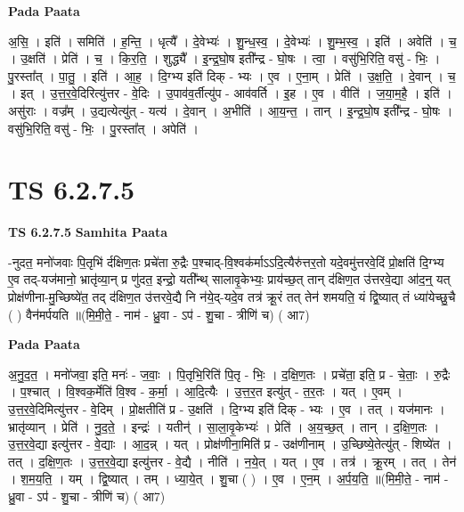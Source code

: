 \documentclass[17pt]{extarticle}
\begin{document}
\textbf{Pada Paata} \newline

अ॒सि॒ । इति॑ । समिति॑ । ह॒न्ति॒ । धृत्यै᳚ । दे॒वेभ्यः॑ । शु॒न्ध॒स्व॒ । दे॒वेभ्यः॑ । शु॒म्भ॒स्व॒ । इति॑ । अवेति॑ । च॒ । उ॒क्षति॑ । प्रेति॑ । च॒ । कि॒र॒ति॒ । शुद्ध्यै᳚ । इ॒न्द्र॒घो॒ष इती᳚न्द्र - घो॒षः । त्वा॒ । वसु॑भि॒रिति॒ वसु॑ - भिः॒ । पु॒रस्ता᳚त् । पा॒तु॒ । इति॑ । आ॒ह॒ । दि॒ग्भ्य इति॑ दिक् - भ्यः । ए॒व । ए॒ना॒म् । प्रेति॑ । उ॒क्ष॒ति॒ । दे॒वान् । च॒ । इत् । उ॒त्त॒र॒वे॒दिरित्यु॑त्तर - वे॒दिः । उ॒पाव॑व॒र्तीत्यु॑प - आव॑वर्ति । इ॒ह । ए॒व । वीति॑ । ज॒या॒म॒है॒ । इति॑ । असु॑राः । वज्र᳚म् । उ॒द्यत्येत्यु॑त् - यत्य॑ । दे॒वान् । अ॒भीति॑ । आ॒य॒न्त॒ । तान् । इ॒न्द्र॒घो॒ष इती᳚न्द्र - घो॒षः । वसु॑भि॒रिति॒ वसु॑ - भिः॒ । पु॒रस्ता᳚त् । अपेति॑ ।  \newline




\section*{ TS 6.2.7.5 }

\textbf{TS 6.2.7.5 } \newline
\textbf{Samhita Paata} \newline

-नुदत॒ मनो॑जवाः पि॒तृभि॑ र्दक्षिण॒तः प्रचे॑ता रु॒द्रैः प॒श्चाद्-वि॒श्वक॑र्माऽऽदि॒त्यैरु॑त्तर॒तो यदे॒वमु॑त्तरवे॒दिं प्रो॒क्षति॑ दि॒ग्भ्य ए॒व तद्-यज॑मानो॒ भ्रातृ॑व्या॒न् प्र णु॑दत॒ इन्द्रो॒ यती᳚न्थ् सालावृ॒केभ्यः॒ प्राय॑च्छ॒त् तान् द॑क्षिण॒त उ॑त्तरवे॒द्या आ॑द॒न्॒ यत् प्रोक्ष॑णीना-मु॒च्छिष्ये॑त॒ तद् द॑क्षिण॒त उ॑त्तरवे॒द्यै नि न॑ये॒द्-यदे॒व तत्र॑ क्रू॒रं तत् तेन॑ शमयति॒ यं द्वि॒ष्यात् तं ध्या॑येच्छु॒चै ( ) वैन॑मर्पयति ॥(मि॒मी॒ते॒ - नाम॑ - ध्रु॒वा - ऽप॑ - शु॒चा - त्रीणि॑ च) ( आ7) \newline

\textbf{Pada Paata} \newline

अ॒नु॒द॒त॒ । मनो॑जवा॒ इति॒ मनः॑ - ज॒वाः॒ । पि॒तृभि॒रिति॑ पि॒तृ - भिः॒ । द॒क्षि॒ण॒तः । प्रचे॑ता॒ इति॒ प्र - चे॒ताः॒ । रु॒द्रैः । प॒श्चात् । वि॒श्वक॒र्मेति॑ वि॒श्व - क॒र्मा॒ । आ॒दि॒त्यैः । उ॒त्त॒र॒त इत्यु॑त् - त॒र॒तः । यत् । ए॒वम् । उ॒त्त॒र॒वे॒दिमित्यु॑त्तर - वे॒दिम् । प्रो॒क्षतीति॑ प्र - उ॒क्षति॑ । दि॒ग्भ्य इति॑ दिक् - भ्यः । ए॒व । तत् । यज॑मानः । भ्रातृ॑व्यान् । प्रेति॑ । नु॒द॒ते॒ । इन्द्रः॑ । यतीन्॑ । सा॒ला॒वृ॒केभ्यः॑ । प्रेति॑ । अ॒य॒च्छ॒त् । तान् । द॒क्षि॒ण॒तः । उ॒त्त॒र॒वे॒द्या इत्यु॑त्तर - वे॒द्याः । आ॒द॒न्न् । यत् । प्रोक्ष॑णीना॒मिति॑ प्र - उक्ष॑णीनाम् । उ॒च्छिष्ये॒तेत्यु॑त् - शिष्ये॑त । तत् । द॒क्षि॒ण॒तः । उ॒त्त॒र॒वे॒द्या इत्यु॑त्तर - वे॒द्यै । नीति॑ । न॒ये॒त् । यत् । ए॒व । तत्र॑ । क्रू॒रम् । तत् । तेन॑ । श॒म॒य॒ति॒ । यम् । द्वि॒ष्यात् । तम् । ध्या॒ये॒त् । शु॒चा ( ) । ए॒व । ए॒न॒म् । अ॒र्प॒य॒ति॒ ॥(मि॒मी॒ते॒ - नाम॑ - ध्रु॒वा - ऽप॑ - शु॒चा - त्रीणि॑ च) ( आ7)  \newline
\end{document}
